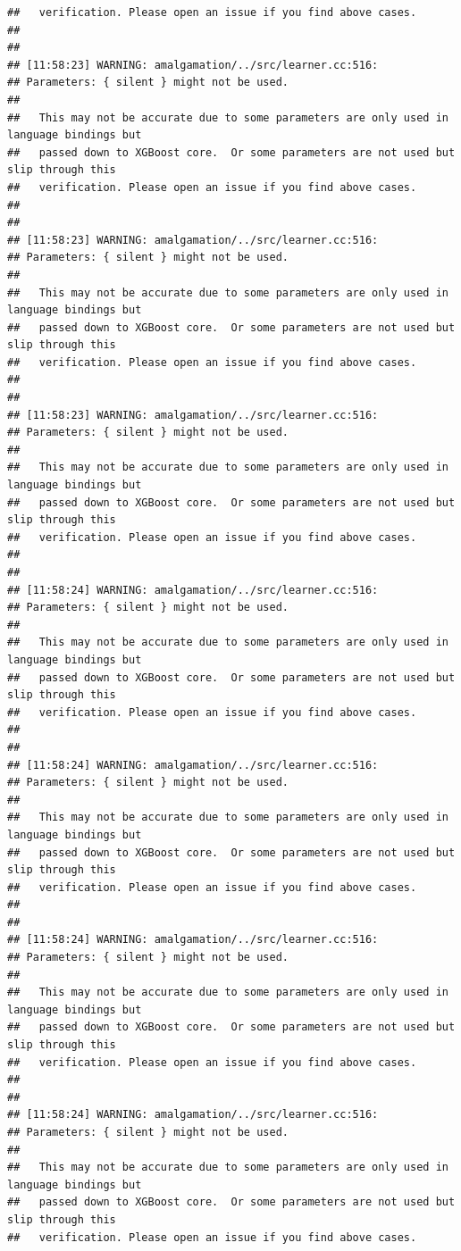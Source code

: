 \documentclass[AMS,STIX2COL]{WileyNJD-v2}\usepackage[]{graphicx}\usepackage[]{color}
\makeatletter
\newenvironment{kframe}{%
 \def\at@end@of@kframe{}%
 \ifinner\ifhmode%
  \def\at@end@of@kframe{\end{minipage}}%
  \begin{minipage}{\columnwidth}%
 \fi\fi%
 \def\FrameCommand##1{\hskip\@totalleftmargin \hskip-\fboxsep
 \colorbox{shadecolor}{##1}\hskip-\fboxsep
     \hskip-\linewidth \hskip-\@totalleftmargin \hskip\columnwidth}%
 \MakeFramed {\advance\hsize-\width
   \@totalleftmargin\z@ \linewidth\hsize
   \@setminipage}}%
 {\par\unskip\endMakeFramed%
 \at@end@of@kframe}
\newenvironment{knitrout}{}{} %
\makeatother
\begin{document}
\begin{knitrout}
\begin{kframe}
\begin{verbatim}
##   verification. Please open an issue if you find above cases.
## 
## 
## [11:58:23] WARNING: amalgamation/../src/learner.cc:516: 
## Parameters: { silent } might not be used.
## 
##   This may not be accurate due to some parameters are only used in language bindings but
##   passed down to XGBoost core.  Or some parameters are not used but slip through this
##   verification. Please open an issue if you find above cases.
## 
## 
## [11:58:23] WARNING: amalgamation/../src/learner.cc:516: 
## Parameters: { silent } might not be used.
## 
##   This may not be accurate due to some parameters are only used in language bindings but
##   passed down to XGBoost core.  Or some parameters are not used but slip through this
##   verification. Please open an issue if you find above cases.
## 
## 
## [11:58:23] WARNING: amalgamation/../src/learner.cc:516: 
## Parameters: { silent } might not be used.
## 
##   This may not be accurate due to some parameters are only used in language bindings but
##   passed down to XGBoost core.  Or some parameters are not used but slip through this
##   verification. Please open an issue if you find above cases.
## 
## 
## [11:58:24] WARNING: amalgamation/../src/learner.cc:516: 
## Parameters: { silent } might not be used.
## 
##   This may not be accurate due to some parameters are only used in language bindings but
##   passed down to XGBoost core.  Or some parameters are not used but slip through this
##   verification. Please open an issue if you find above cases.
## 
## 
## [11:58:24] WARNING: amalgamation/../src/learner.cc:516: 
## Parameters: { silent } might not be used.
## 
##   This may not be accurate due to some parameters are only used in language bindings but
##   passed down to XGBoost core.  Or some parameters are not used but slip through this
##   verification. Please open an issue if you find above cases.
## 
## 
## [11:58:24] WARNING: amalgamation/../src/learner.cc:516: 
## Parameters: { silent } might not be used.
## 
##   This may not be accurate due to some parameters are only used in language bindings but
##   passed down to XGBoost core.  Or some parameters are not used but slip through this
##   verification. Please open an issue if you find above cases.
## 
## 
## [11:58:24] WARNING: amalgamation/../src/learner.cc:516: 
## Parameters: { silent } might not be used.
## 
##   This may not be accurate due to some parameters are only used in language bindings but
##   passed down to XGBoost core.  Or some parameters are not used but slip through this
##   verification. Please open an issue if you find above cases.

\end{verbatim}
\end{kframe}
\end{knitrout}
\end{document}
